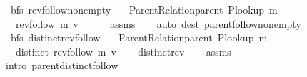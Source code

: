 \begin{isabellebody}
\endisatagproof
{\isafoldproof}%
%
\isadelimproof
\isanewline
%
\endisadelimproof
%
\isadeliminvisible
\isanewline
%
\endisadeliminvisible
%
\isataginvisible
{}\isamarkupfalse%
\ {\isacharparenleft}{\kern0pt}\ bfs{\isacharparenright}{\kern0pt}\ rev{\isacharunderscore}{\kern0pt}follow{\isacharunderscore}{\kern0pt}non{\isacharunderscore}{\kern0pt}empty{\isacharcolon}{\kern0pt}\isanewline
\ \ \ {\isachardoublequoteopen}Parent{\isacharunderscore}{\kern0pt}Relation{\isachardot}{\kern0pt}parent\ {\isacharparenleft}{\kern0pt}P{\isacharunderscore}{\kern0pt}lookup\ m{\isacharparenright}{\kern0pt}{\isachardoublequoteclose}\isanewline
\ \ \ {\isachardoublequoteopen}rev{\isacharunderscore}{\kern0pt}follow\ m\ v\ {\isasymnoteq}\ {\isacharbrackleft}{\kern0pt}{\isacharbrackright}{\kern0pt}{\isachardoublequoteclose}%
\endisataginvisible
{\isafoldinvisible}%
%
\isadeliminvisible
\isanewline
%
\endisadeliminvisible
%
\isadelimproof
\ \ %
\endisadelimproof
%
\isatagproof
{}\isamarkupfalse%
\ assms\isanewline
\ \ \isamarkupfalse%
\ {\isacharparenleft}{\kern0pt}auto\ dest{\isacharcolon}{\kern0pt}\ parent{\isachardot}{\kern0pt}follow{\isacharunderscore}{\kern0pt}non{\isacharunderscore}{\kern0pt}empty{\isacharparenright}{\kern0pt}%
\endisatagproof
{\isafoldproof}%
%
\isadelimproof
\isanewline
%
\endisadelimproof
%
\isadeliminvisible
\isanewline
%
\endisadeliminvisible
%
\isataginvisible
{}\isamarkupfalse%
\ {\isacharparenleft}{\kern0pt}\ bfs{\isacharparenright}{\kern0pt}\ distinct{\isacharunderscore}{\kern0pt}rev{\isacharunderscore}{\kern0pt}follow{\isacharcolon}{\kern0pt}\isanewline
\ \ \ {\isachardoublequoteopen}Parent{\isacharunderscore}{\kern0pt}Relation{\isachardot}{\kern0pt}parent\ {\isacharparenleft}{\kern0pt}P{\isacharunderscore}{\kern0pt}lookup\ m{\isacharparenright}{\kern0pt}{\isachardoublequoteclose}\isanewline
\ \ \ {\isachardoublequoteopen}distinct\ {\isacharparenleft}{\kern0pt}rev{\isacharunderscore}{\kern0pt}follow\ m\ v{\isacharparenright}{\kern0pt}{\isachardoublequoteclose}%
\endisataginvisible
{\isafoldinvisible}%
%
\isadeliminvisible
\isanewline
%
\endisadeliminvisible
%
\isadelimproof
\ \ %
\endisadelimproof
%
\isatagproof
{}\isamarkupfalse%
\ distinct{\isacharunderscore}{\kern0pt}rev\isanewline
\ \ \isamarkupfalse%
\ assms\isanewline
\ \ \isamarkupfalse%
\ {\isacharparenleft}{\kern0pt}intro\ parent{\isachardot}{\kern0pt}distinct{\isacharunderscore}{\kern0pt}follow{\isacharparenright}{\kern0pt}%

\end{isabellebody}
